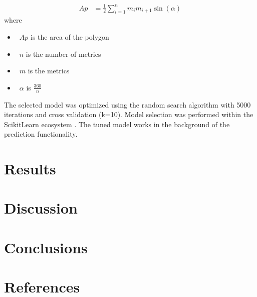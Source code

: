 \documentclass{article}
\begin{document}
\begin{equation}\label{eq:polygon_area}
    \begin{split}
        Ap & =\frac{1}{2}\sum_{i=1}^nm_i m_{i+1} \sin(\alpha)
    \end{split}
\end{equation}
where
\begin{itemize}
    \item[] ~$Ap$ is the area of the polygon
    \item[] ~$n$ is the number of metrics
    \item[] ~$m$ is the metrics
    \item[] ~$\alpha$ is $\frac{360}{n}$
\end{itemize}

The selected model was optimized using the random search algorithm with 5000 iterations and cross validation (k=10). Model selection was performed within the ScikitLearn ecosystem \cite{scikitlearn}. The tuned model works in the background of the prediction functionality.

\section{Results}

\begin{comment}
\begin{figure}[H]
    \centering
    \texttt{[image: ml\_plot.png]}
    \caption{Feature selection, model selection and optimization.}
    \label{fig:feature_selection}
\end{figure}

\begin{figure}[H]
    \centering
    \texttt{[image: MANUDB.png]}
    \caption{The architecture of MANUDB}
    \label{fig:architecture}
\end{figure}

\begin{figure}[H]
    \centering
    \texttt{[image: chord.png]}
    \caption{Sample chord diagrams}
    \label{fig:chords}
\end{figure}

\begin{figure}[H]
    \centering
    \texttt{[image: taxonomical\_structure.png]}
    \caption{The taxonomical structure of MANUDB}
    \label{fig:taxonomy}
\end{figure}
\end{comment}


\section{Discussion}
\section{Conclusions}
\section{References}
\printbibliography[heading=none]
\end{document}
